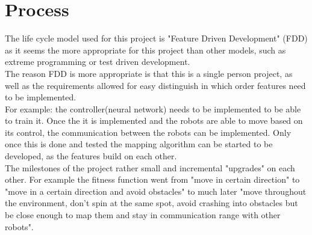 \section{Process}
The life cycle model used for this project is "Feature Driven Development" (FDD) as it seems the more appropriate for this project than other models, such as extreme programming or test driven development. \\
The reason FDD is more appropriate is that this is a single person project, as well as the requirements allowed for easy distinguish in which order features need to be implemented.  \\
For example: the controller(neural network) needs to be implemented to be able to train it. Once the it is implemented and the robots are able to move based on its control, the communication between the robots can be implemented. Only once this is done and tested the mapping algorithm can be started to be developed, as the features build on each other.\\

The milestones of the project rather small and incremental "upgrades" on each other. For example the fitness function went from "move in certain direction" to "move in a certain direction and avoid obstacles" to much later "move throughout the environment, don't spin at the same spot, avoid crashing into obstacles but be close enough to map them and stay in communication range with other robots". \\
 


